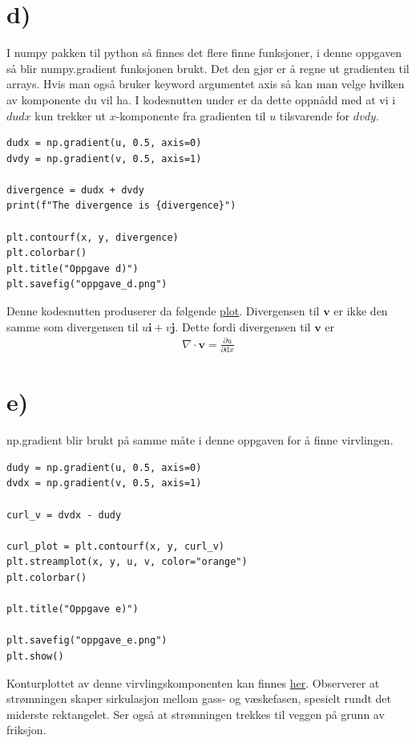 \documentclass[a4paper,10pt,norsk]{article}
\newcommand{\dd}[1]{\mathrm{d}#1}
\begin{document}
	\section*{d)}\label{ass:d}
	I numpy pakken til python så finnes det flere finne funksjoner, i denne oppgaven så blir numpy.gradient funksjonen brukt. 
	Det den gjør er å regne ut gradienten til arrays. 
	Hvis man også bruker keyword argumentet axis så kan man velge hvilken av komponente du vil ha. 
	I kodesnutten under er da dette oppnådd med at vi i $dudx$ kun trekker ut $x$-komponente fra gradienten til $u$ tilsvarende for  $dvdy$.
	\begin{lstlisting}[caption=Oppgave d]
dudx = np.gradient(u, 0.5, axis=0)
dvdy = np.gradient(v, 0.5, axis=1)

divergence = dudx + dvdy
print(f"The divergence is {divergence}")

plt.contourf(x, y, divergence)
plt.colorbar()
plt.title("Oppgave d)")
plt.savefig("oppgave_d.png")
	\end{lstlisting}
	Denne kodesnutten produserer da følgende \hyperref[fig:d]{plot}.
	Divergensen til $\mathbf{v}$ er ikke den samme som divergensen til $u \mathbf{i} + v \mathbf{j}$.
	Dette fordi divergensen til $\mathbf{v}$ er
	\begin{align*}
		\nabla \cdot \mathbf{v} = \frac{\partial u}{\partial \dd{x}} 	
	\end{align*}
	
	\section*{e)}\label{ass:e}
	np.gradient blir brukt på samme måte i denne oppgaven for å finne virvlingen.
	\begin{lstlisting}
dudy = np.gradient(u, 0.5, axis=0)
dvdx = np.gradient(v, 0.5, axis=1)

curl_v = dvdx - dudy

curl_plot = plt.contourf(x, y, curl_v)
plt.streamplot(x, y, u, v, color="orange")
plt.colorbar()

plt.title("Oppgave e)")

plt.savefig("oppgave_e.png")
plt.show()
	\end{lstlisting}
	Konturplottet av denne virvlingskomponenten kan finnes \hyperref[fig:e]{her}. Observerer at strømningen skaper sirkulasjon mellom gass- og væskefasen, spesielt rundt det miderste rektangelet. Ser også at strømningen trekkes til veggen på grunn av friksjon. 
\end{document}
